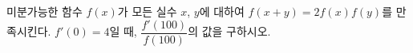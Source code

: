미분가능한 함수 $f(x)$가 모든 실수 $x$, $y$에 대하여 $f(x+y)=2f(x)f(y)$를 만족시킨다. $f'(0)=4$일 때, $\dfrac{f'(100)}{f(100)}$의 값을 구하시오. 
